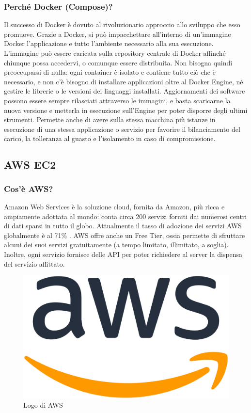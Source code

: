             \subsubsection{Perché Docker (Compose)?}
                Il successo di Docker è dovuto al rivoluzionario approccio allo sviluppo che esso promuove. Grazie a Docker, si può impacchettare all'interno di un'immagine Docker l'applicazione e tutto l'ambiente necessario alla sua esecuzione. L'immagine può essere caricata sulla repository centrale di Docker affinché chiunque possa accedervi, o comunque essere distribuita. Non bisogna quindi preoccuparsi di nulla: ogni container è isolato e contiene tutto ciò che è necessario, e non c'è bisogno di installare applicazioni oltre al Docker Engine, né gestire le librerie o le versioni dei linguaggi installati. Aggiornamenti dei software possono essere sempre rilasciati attraverso le immagini, e basta scaricarne la nuova versione e metterla in esecuzione sull'Engine per poter disporre degli ultimi strumenti. Permette anche di avere sulla stessa macchina più istanze in esecuzione di una stessa applicazione o servizio per favorire il bilanciamento del carico, la tolleranza al guasto e l'isolamento in caso di compromissione.
                
        \subsection{AWS EC2}
            \subsubsection{Cos'è AWS? \cite{AWS1}}
                Amazon Web Services è la soluzione cloud, fornita da Amazon, più ricca e ampiamente adottata al mondo: conta circa 200 servizi forniti dai numerosi centri di dati sparsi in tutto il globo. Attualmente il tasso di adozione dei servizi AWS globalmente è al 71\% \cite{CNN1}. AWS offre anche un Free Tier, ossia permette di sfruttare alcuni dei suoi servizi gratuitamente (a tempo limitato, illimitato, a soglia). Inoltre, ogni servizio fornisce delle API per poter richiedere al server la dispensa del servizio affittato.
            \begin{figure}[htbp!]
                \centering
                \includegraphics[width=0.2\linewidth]{Immagini/System Design/AWS.png}
                \caption{Logo di AWS}
            \end{figure}
